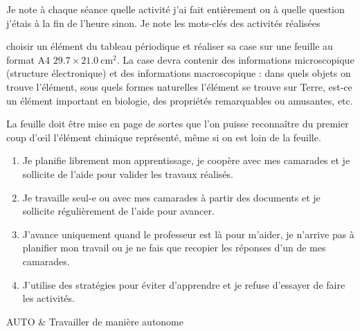 Je note à chaque séance quelle activité j'ai fait entièrement ou à quelle question j'étais à la fin de l'heure sinon.
Je note les mots-clés des activités réalisées
\medskip


\begin{programmeSeance}
  \seance \seance \seance
\end{programmeSeance}

\begin{programmeSeance}[distance = 0pt]
  \seance
\end{programmeSeance}


\begin{tacheFinale}
   choisir un élément du tableau périodique et réaliser sa case sur une feuille au format A4 $\num{29,7} \times\qty{21,0}{\cm\squared}$.
  La case devra contenir des informations microscopique (structure électronique) et des informations macroscopique : dans quels objets on trouve l'élément, sous quels formes naturelles l'élément se trouve sur Terre, est-ce un élément important en biologie, des propriétés remarquables ou amusantes, etc.

  La feuille doit être mise en page de sortes que l'on puisse reconnaître du premier coup d’œil l'élément chimique représenté, même si on est loin de la feuille.
\end{tacheFinale}




\begin{enumerate}[label = \Alph*]
  \item Je planifie librement mon apprentissage, je coopère avec mes camarades et je sollicite de l'aide pour valider les travaux réalisés.
  \item Je travaille seul-e ou avec mes camarades à partir des documents et je sollicite régulièrement de l'aide pour avancer.
  \item J'avance uniquement quand le professeur est là pour m'aider, je n'arrive pas à planifier mon travail ou je ne fais que recopier les réponses d'un de mes camarades.
  \item J'utilise des stratégies pour éviter d'apprendre et je refuse d'essayer de faire les activités.
\end{enumerate}

\begin{tableauCompetences}
  AUTO & Travailler de manière autonome \\
\end{tableauCompetences}
